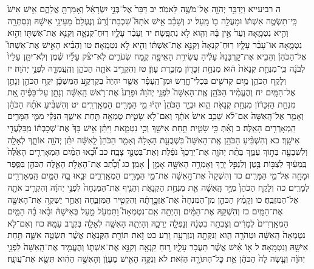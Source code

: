 \documentclass[twoside, openany, parskip=half, 11pt]{book}
\begin{document}
ה רביעייא וַיְדַבֵּ֥ר יְהֹוָ֖ה אֶל־מֹשֶׁ֥ה לֵּאמֹֽר׃ יב דַּבֵּר֙ אֶל־בְּנֵ֣י יִשְׂרָאֵ֔ל וְאָמַרְתָּ֖ אֲלֵהֶ֑ם אִ֥ישׁ אִישׁ֙ כִּֽי־תִשְׂטֶ֣ה אִשְׁתּ֔וֹ וּמָעֲלָ֥ה ב֖וֹ מָֽעַל׃ יג וְשָׁכַ֨ב אִ֣ישׁ אֹתָהּ֮ שִׁכְבַת־זֶ֒רַע֒ וְנֶעְלַם֙ מֵעֵינֵ֣י אִישָׁ֔הּ וְנִסְתְּרָ֖ה וְהִ֣יא נִטְמָ֑אָה וְעֵד֙ אֵ֣ין בָּ֔הּ וְהִ֖וא לֹ֥א נִתְפָּֽשָׂה׃ יד וְעָבַ֨ר עָלָ֧יו רֽוּחַ־קִנְאָ֛ה וְקִנֵּ֥א אֶת־אִשְׁתּ֖וֹ וְהִ֣וא נִטְמָ֑אָה אוֹ־עָבַ֨ר עָלָ֤יו רֽוּחַ־קִנְאָה֙ וְקִנֵּ֣א אֶת־אִשְׁתּ֔וֹ וְהִ֖יא לֹ֥א נִטְמָֽאָה׃ טו וְהֵבִ֨יא הָאִ֣ישׁ אֶת־אִשְׁתּוֹ֮ אֶל־הַכֹּהֵן֒ וְהֵבִ֤יא אֶת־קׇרְבָּנָהּ֙ עָלֶ֔יהָ עֲשִׂירִ֥ת הָאֵיפָ֖ה קֶ֣מַח שְׂעֹרִ֑ים לֹֽא־יִצֹ֨ק עָלָ֜יו שֶׁ֗מֶן וְלֹֽא־יִתֵּ֤ן עָלָיו֙ לְבֹנָ֔ה כִּֽי־מִנְחַ֤ת קְנָאֹת֙ ה֔וּא מִנְחַ֥ת זִכָּר֖וֹן מַזְכֶּ֥רֶת עָוֺֽן׃ טז וְהִקְרִ֥יב אֹתָ֖הּ הַכֹּהֵ֑ן וְהֶֽעֱמִדָ֖הּ לִפְנֵ֥י יְהֹוָה׃ יז וְלָקַ֧ח הַכֹּהֵ֛ן מַ֥יִם קְדֹשִׁ֖ים בִּכְלִי־חָ֑רֶשׂ וּמִן־הֶֽעָפָ֗ר אֲשֶׁ֤ר יִהְיֶה֙ בְּקַרְקַ֣ע הַמִּשְׁכָּ֔ן יִקַּ֥ח הַכֹּהֵ֖ן וְנָתַ֥ן אֶל־הַמָּֽיִם׃ יח וְהֶעֱמִ֨יד הַכֹּהֵ֥ן אֶֽת־הָאִשָּׁה֮ לִפְנֵ֣י יְהֹוָה֒ וּפָרַע֙ אֶת־רֹ֣אשׁ הָֽאִשָּׁ֔ה וְנָתַ֣ן עַל־כַּפֶּ֗יהָ אֵ֚ת מִנְחַ֣ת הַזִּכָּר֔וֹן מִנְחַ֥ת קְנָאֹ֖ת הִ֑וא וּבְיַ֤ד הַכֹּהֵן֙ יִהְי֔וּ מֵ֥י הַמָּרִ֖ים הַמְאָֽרְרִֽים׃ יט וְהִשְׁבִּ֨יעַ אֹתָ֜הּ הַכֹּהֵ֗ן וְאָמַ֤ר אֶל־הָֽאִשָּׁה֙ אִם־לֹ֨א שָׁכַ֥ב אִישׁ֙ אֹתָ֔ךְ וְאִם־לֹ֥א שָׂטִ֛ית טֻמְאָ֖ה תַּ֣חַת אִישֵׁ֑ךְ הִנָּקִ֕י מִמֵּ֛י הַמָּרִ֥ים הַֽמְאָרְרִ֖ים הָאֵֽלֶּה׃ כ וְאַ֗תְּ כִּ֥י שָׂטִ֛ית תַּ֥חַת אִישֵׁ֖ךְ וְכִ֣י נִטְמֵ֑את וַיִּתֵּ֨ן אִ֥ישׁ בָּךְ֙ אֶת־שְׁכׇבְתּ֔וֹ מִֽבַּלְעֲדֵ֖י אִישֵֽׁךְ׃ כא וְהִשְׁבִּ֨יעַ הַכֹּהֵ֥ן אֶֽת־הָאִשָּׁה֮ בִּשְׁבֻעַ֣ת הָאָלָה֒ וְאָמַ֤ר הַכֹּהֵן֙ לָֽאִשָּׁ֔ה יִתֵּ֨ן יְהֹוָ֥ה אוֹתָ֛ךְ לְאָלָ֥ה וְלִשְׁבֻעָ֖ה בְּת֣וֹךְ עַמֵּ֑ךְ בְּתֵ֨ת יְהֹוָ֤ה אֶת־יְרֵכֵךְ֙ נֹפֶ֔לֶת וְאֶת־בִּטְנֵ֖ךְ צָבָֽה׃ כב וּ֠בָ֠אוּ הַמַּ֨יִם הַמְאָרְרִ֤ים הָאֵ֙לֶּה֙ בְּֽמֵעַ֔יִךְ לַצְבּ֥וֹת בֶּ֖טֶן וְלַנְפִּ֣ל יָרֵ֑ךְ וְאָמְרָ֥ה הָאִשָּׁ֖ה אָמֵ֥ן ׀ אָמֵֽן׃ כג וְ֠כָתַ֠ב אֶת־הָאָלֹ֥ת הָאֵ֛לֶּה הַכֹּהֵ֖ן בַּסֵּ֑פֶר וּמָחָ֖ה אֶל־מֵ֥י הַמָּרִֽים׃ כד וְהִשְׁקָה֙ אֶת־הָ֣אִשָּׁ֔ה אֶת־מֵ֥י הַמָּרִ֖ים הַמְאָֽרְרִ֑ים וּבָ֥אוּ בָ֛הּ הַמַּ֥יִם הַֽמְאָרְרִ֖ים לְמָרִֽים׃ כה וְלָקַ֤ח הַכֹּהֵן֙ מִיַּ֣ד הָֽאִשָּׁ֔ה אֵ֖ת מִנְחַ֣ת הַקְּנָאֹ֑ת וְהֵנִ֤יף אֶת־הַמִּנְחָה֙ לִפְנֵ֣י יְהֹוָ֔ה וְהִקְרִ֥יב אֹתָ֖הּ אֶל־הַמִּזְבֵּֽחַ׃ כו וְקָמַ֨ץ הַכֹּהֵ֤ן מִן־הַמִּנְחָה֙ אֶת־אַזְכָּ֣רָתָ֔הּ וְהִקְטִ֖יר הַמִּזְבֵּ֑חָה וְאַחַ֛ר יַשְׁקֶ֥ה אֶת־הָאִשָּׁ֖ה אֶת־הַמָּֽיִם׃ כז וְהִשְׁקָ֣הּ אֶת־הַמַּ֗יִם וְהָיְתָ֣ה אִֽם־נִטְמְאָה֮ וַתִּמְעֹ֣ל מַ֣עַל בְּאִישָׁהּ֒ וּבָ֨אוּ בָ֜הּ הַמַּ֤יִם הַמְאָֽרְרִים֙ לְמָרִ֔ים וְצָבְתָ֣ה בִטְנָ֔הּ וְנָפְלָ֖ה יְרֵכָ֑הּ וְהָיְתָ֧ה הָאִשָּׁ֛ה לְאָלָ֖ה בְּקֶ֥רֶב עַמָּֽהּ׃ כח וְאִם־לֹ֤א נִטְמְאָה֙ הָֽאִשָּׁ֔ה וּטְהֹרָ֖ה הִ֑וא וְנִקְּתָ֖ה וְנִזְרְעָ֥ה זָֽרַע׃ כט זֹ֥את תּוֹרַ֖ת הַקְּנָאֹ֑ת אֲשֶׁ֨ר תִּשְׂטֶ֥ה אִשָּׁ֛ה תַּ֥חַת אִישָׁ֖הּ וְנִטְמָֽאָה׃ ל א֣וֹ אִ֗ישׁ אֲשֶׁ֨ר תַּעֲבֹ֥ר עָלָ֛יו ר֥וּחַ קִנְאָ֖ה וְקִנֵּ֣א אֶת־אִשְׁתּ֑וֹ וְהֶעֱמִ֤יד אֶת־הָֽאִשָּׁה֙ לִפְנֵ֣י יְהֹוָ֔ה וְעָ֤שָׂה לָהּ֙ הַכֹּהֵ֔ן אֵ֥ת כׇּל־הַתּוֹרָ֖ה הַזֹּֽאת׃ לא וְנִקָּ֥ה הָאִ֖ישׁ מֵעָוֺ֑ן וְהָאִשָּׁ֣ה הַהִ֔וא תִּשָּׂ֖א אֶת־עֲוֺנָֽהּ׃
\end{document}
